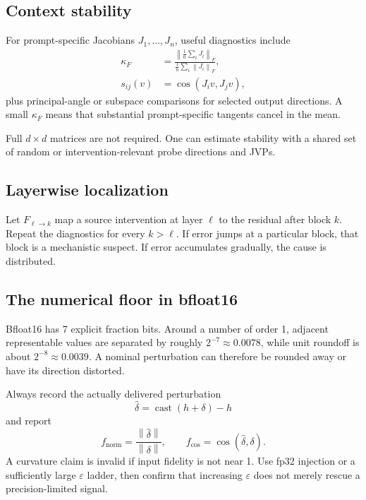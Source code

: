 \documentclass[11pt]{article}
\newcommand{\Norm}[1]{\left\lVert #1 \right\rVert}
\newcommand{\eps}{\varepsilon}
\theoremstyle{definition}
\theoremstyle{remark}
\begin{document}
\subsection{Context stability}
For prompt-specific Jacobians $J_1,\ldots,J_n$, useful diagnostics include
\begin{align}
  \kappa_F &= \frac{\Norm{\frac{1}{n}\sum_i J_i}_F}
  {\frac{1}{n}\sum_i\Norm{J_i}_F},
  \label{eq:cancellation_index}\\
  s_{ij}(v) &= \cos(J_iv,J_jv),
  \label{eq:directional_stability}
\end{align}
plus principal-angle or subspace comparisons for selected output directions. A small $\kappa_F$ means that substantial prompt-specific tangents cancel in the mean.

Full $d\times d$ matrices are not required. One can estimate stability with a shared set of random or intervention-relevant probe directions and JVPs.

\subsection{Layerwise localization}
Let $F_{\ell\rightarrow k}$ map a source intervention at layer $\ell$ to the residual after block $k$. Repeat the diagnostics for every $k>\ell$. If error jumps at a particular block, that block is a mechanistic suspect. If error accumulates gradually, the cause is distributed.

\subsection{The numerical floor in bfloat16}
Bfloat16 has 7 explicit fraction bits. Around a number of order 1, adjacent representable values are separated by roughly $2^{-7}\approx 0.0078$, while unit roundoff is about $2^{-8}\approx 0.0039$. A nominal perturbation can therefore be rounded away or have its direction distorted.

Always record the actually delivered perturbation
\begin{equation}
  \widehat{\delta}=\operatorname{cast}(h+\delta)-h
\end{equation}
and report
\begin{equation}
  f_{\mathrm{norm}}=\frac{\Norm{\widehat{\delta}}}{\Norm{\delta}},
  \qquad
  f_{\mathrm{cos}}=\cos(\widehat{\delta},\delta).
\end{equation}
A curvature claim is invalid if input fidelity is not near 1. Use fp32 injection or a sufficiently large $\eps$ ladder, then confirm that increasing $\eps$ does not merely rescue a precision-limited signal.
\end{document}
